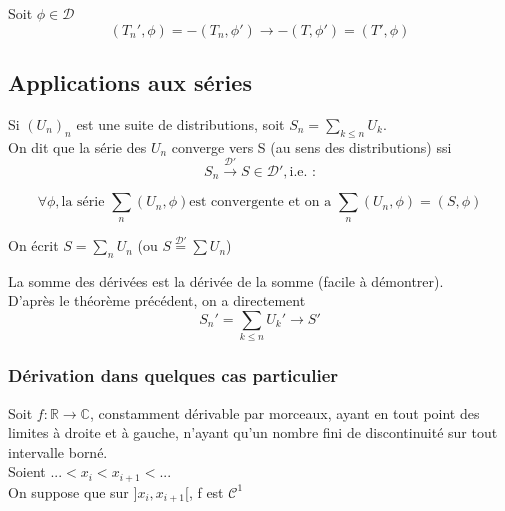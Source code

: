 \documentclass{article}
\begin{document}
\begin{dem}
Soit $\phi \in \mathcal{D}$ 
\[(T_n',\phi)=-(T_n,\phi') \rightarrow -(T,\phi')=(T',\phi)\]
\end{dem}

\subsection{Applications aux séries}
Si $(U_n)_n$ est une suite de distributions, soit $S_n=\sum_{k\leq n} U_k$.\\
On dit que la série des $U_n$ converge vers S (au sens des distributions) ssi \[S_n \xrightarrow{\mathcal{D}'} S \in \mathcal{D}', \text{i.e. :}\]

\[\forall \phi, \text{la série } \sum_n (U_n,\phi) \text{est convergente et on a } \sum_n (U_n,\phi) = (S,\phi)\]

On écrit $S=\sum_n U_n$ (ou $S\overset{\mathcal{D}'}{=} \sum U_n$)


\begin{dem}
La somme des dérivées est la dérivée de la somme (facile à démontrer).\\
D'après le théorème précédent, on a directement \[S_n'=\sum_{k\leq n} U_k' \rightarrow S'\]
\end{dem}

\subsubsection{Dérivation dans quelques cas particulier}
Soit $f:\mathbb{R}\rightarrow \mathbb{C}$, constamment dérivable par morceaux, ayant en tout point des limites à droite et à gauche, n'ayant qu'un nombre fini de discontinuité sur tout intervalle borné.\\
Soient $... <x_i<x_{i+1}<...$ \\
On suppose que sur $]x_i,x_{i+1}[$, f est $\mathcal{C}^1$

\bigskip
{}
\end{document}
